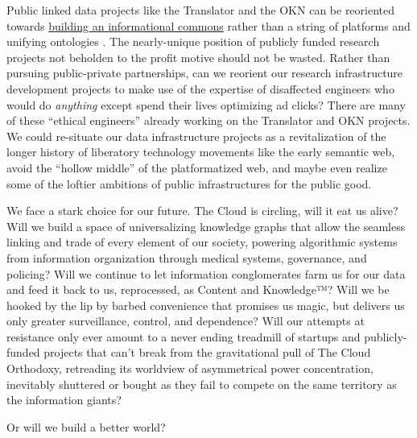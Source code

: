 Public linked data projects like the Translator and the OKN can be
reoriented towards
\href{https://jon-e.net/blog/2023/04/24/Re-NIH-RFI-OSTP-Memo/}{building
an informational commons} rather than a string of platforms and unifying
ontologies \cite{saundersReNIHRFI2023} . The nearly-unique
position of publicly funded research projects not beholden to the profit
motive should not be wasted. Rather than pursuing public-private
partnerships, can we reorient our research infrastructure development
projects to make use of the expertise of disaffected engineers who would
do \emph{anything} except spend their lives optimizing ad clicks? There
are many of these ``ethical engineers'' already working on the
Translator and OKN projects. We could re-situate our data infrastructure
projects as a revitalization of the longer history of liberatory
technology movements like the early semantic web, avoid the ``hollow
middle'' of the platformatized web, and maybe even realize some of the
loftier ambitions of public infrastructures for the public good.

We face a stark choice for our future. The Cloud is circling, will it
eat us alive? Will we build a space of universalizing knowledge graphs
that allow the seamless linking and trade of every element of our
society, powering algorithmic systems from information organization
through medical systems, governance, and policing? Will we continue to
let information conglomerates farm us for our data and feed it back to
us, reprocessed, as Content and Knowledge™? Will we be hooked by the lip
by barbed convenience that promises us magic, but delivers us only
greater surveillance, control, and dependence? Will our attempts at
resistance only ever amount to a never ending treadmill of startups and
publicly-funded projects that can't break from the gravitational pull of
The Cloud Orthodoxy, retreading its worldview of asymmetrical power
concentration, inevitably shuttered or bought as they fail to compete on
the same territory as the information giants?

Or will we build a better world?
